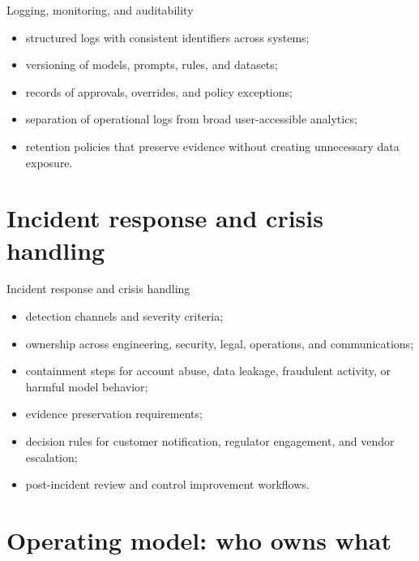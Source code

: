 \documentclass[aspectratio=169]{beamer}
\begin{document}
\begin{frame}{Logging, monitoring, and auditability}
  \begin{itemize}
    \item structured logs with consistent identifiers across systems;
    \item versioning of models, prompts, rules, and datasets;
    \item records of approvals, overrides, and policy exceptions;
    \item separation of operational logs from broad user-accessible analytics;
    \item retention policies that preserve evidence without creating unnecessary data exposure.
  \end{itemize}
\end{frame}

\section{Incident response and crisis handling}

\begin{frame}{Incident response and crisis handling}
  \begin{itemize}
    \item detection channels and severity criteria;
    \item ownership across engineering, security, legal, operations, and communications;
    \item containment steps for account abuse, data leakage, fraudulent activity, or harmful model behavior;
    \item evidence preservation requirements;
    \item decision rules for customer notification, regulator engagement, and vendor escalation;
    \item post-incident review and control improvement workflows.
  \end{itemize}
\end{frame}

\section{Operating model: who owns what}
\end{document}
